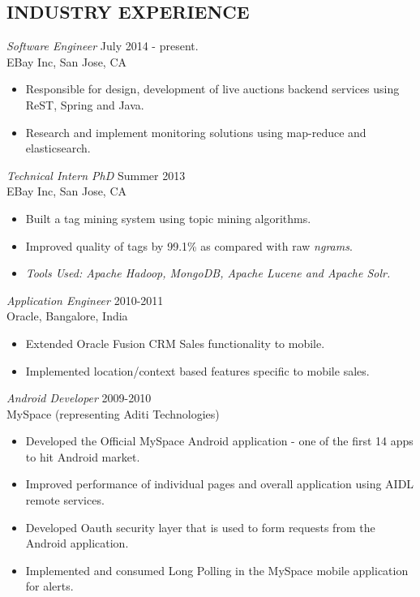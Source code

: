 \documentclass[line,margin]{res}
\begin{document}
\begin{resume}
		\section{INDUSTRY EXPERIENCE} 
		{\sl Software Engineer} \hfill July 2014 - present.\\
		EBay Inc, San Jose, CA
		\begin{itemize}  \itemsep -2pt %
			\item Responsible for design, development of live auctions backend services using ReST, Spring and Java.
			\item Research and implement monitoring solutions using map-reduce and elasticsearch. 
		\end{itemize}
		{\sl Technical Intern PhD} \hfill Summer 2013\\
		EBay Inc, San Jose, CA
		\begin{itemize}  \itemsep -2pt %
			\item Built a tag mining system using topic mining algorithms.
			\item Improved quality of tags by 99.1\% as compared with raw \emph{ngrams}.
			\item \emph{Tools Used: Apache Hadoop, MongoDB, Apache Lucene and Apache Solr.}
		\end{itemize}
		{\sl Application Engineer} \hfill 2010-2011 \\
		Oracle, 
		Bangalore, India
		\begin{itemize}  \itemsep -2pt %
			\item Extended Oracle Fusion CRM Sales functionality to mobile.
			\item Implemented location/context based features specific to mobile sales.
		\end{itemize}
		{\sl Android Developer} \hfill            2009-2010 \\
		MySpace (representing Aditi Technologies) 
		\begin{itemize}  \itemsep -2pt %
			\item Developed the Official MySpace Android application - one of the first 14 apps to hit Android market.
			\item Improved performance of individual pages and overall application using AIDL
			remote services.
			\item Developed Oauth security layer that is used to form requests from the Android application. 
			\item Implemented and consumed Long Polling in the MySpace mobile application for alerts.

\end{itemize}
\end{resume}
\end{document}
